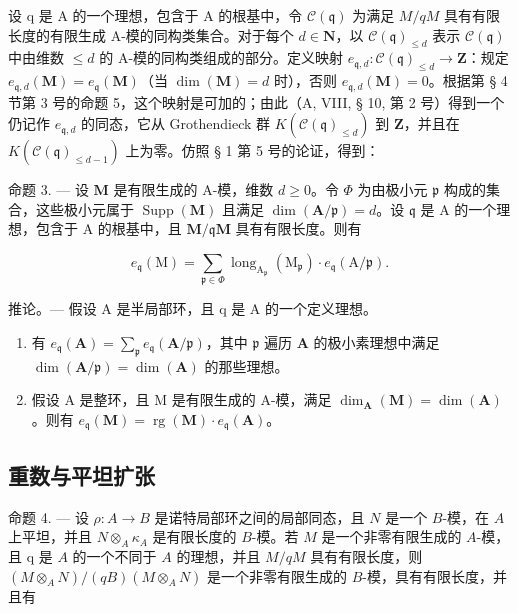 设 q 是 A 的一个理想，包含于 A 的根基中，令 \(\mathcal{C}(\mathfrak{q})\) 为满足 \(M/qM\) 具有有限长度的有限生成 A-模的同构类集合。对于每个 \(d \in \mathbf{N}\)，以 \(\mathcal{C}(\mathfrak{q})_{\leq d}\) 表示 \(\mathcal{C}(\mathfrak{q})\) 中由维数 \(\leqslant d\) 的 A-模的同构类组成的部分。定义映射 \(e_{\mathfrak{q},d}: \mathcal{C}(\mathfrak{q})_{\leq d} \to \mathbf{Z}\)：规定 \(e_{\mathfrak{q},d}(\mathbf{M}) = e_{\mathfrak{q}}(\mathbf{M})\)（当 \(\dim(\mathbf{M}) = d\) 时），否则 \(e_{\mathfrak{q},d}(\mathbf{M}) = 0\)。根据第 § 4 节第 3 号的命题 5，这个映射是可加的；由此（A, VIII, § 10, 第 2 号）得到一个仍记作 \(e_{\mathfrak{q},d}\) 的同态，它从 Grothendieck 群 \(K(\mathcal{C}(\mathfrak{q})_{\leq d})\) 到 \(\mathbf{Z}\)，并且在 \(K(\mathcal{C}(\mathfrak{q})_{\leq d-1})\) 上为零。仿照 § 1 第 5 号的论证，得到：

命题 3. — 设 \(\mathbf{M}\) 是有限生成的 A-模，维数 \(d \geqslant 0\)。令 \(\Phi\) 为由极小元 \(\mathfrak{p}\) 构成的集合，这些极小元属于 \(\operatorname{Supp}(\mathbf{M})\) 且满足 \(\dim(\mathbf{A}/\mathfrak{p}) = d\)。设 \(\mathfrak{q}\) 是 A 的一个理想，包含于 A 的根基中，且 \(\mathbf{M}/\mathfrak{q}\mathbf{M}\) 具有有限长度。则有

\[
e _ {\mathfrak {q}} (\mathrm{M}) = \sum_ {\mathfrak {p} \in \Phi} \operatorname{long} _ {\mathrm{A} _ {\mathfrak {p}}} (\mathrm{M} _ {\mathfrak {p}}) \cdot e _ {\mathfrak {q}} (\mathrm{A} / \mathfrak {p}).
\]

推论。— 假设 A 是半局部环，且 q 是 A 的一个定义理想。

\begin{enumerate}
\def\labelenumi{\alph{enumi})}
\item
  有 \(e_{\mathfrak{q}}(\mathbf{A}) = \sum_{\mathfrak{p}} e_{\mathfrak{q}}(\mathbf{A}/\mathfrak{p})\)，其中 \(\mathfrak{p}\) 遍历 \(\mathbf{A}\) 的极小素理想中满足 \(\dim(\mathbf{A}/\mathfrak{p}) = \dim(\mathbf{A})\) 的那些理想。
\item
  假设 A 是整环，且 M 是有限生成的 A-模，满足 \(\dim_{\mathbf{A}}(\mathbf{M}) = \dim(\mathbf{A})\)。则有 \(e_{\mathfrak{q}}(\mathbf{M}) = \operatorname{rg}(\mathbf{M}) \cdot e_{\mathfrak{q}}(\mathbf{A})\)。
\end{enumerate}

\subsection{重数与平坦扩张}

命题 4. — 设 \(\rho: A \to B\) 是诺特局部环之间的局部同态，且 \(N\) 是一个 \(B\)-模，在 \(A\) 上平坦，并且 \(N \otimes_A \kappa_A\) 是有限长度的 \(B\)-模。若 \(M\) 是一个非零有限生成的 \(A\)-模，且 q 是 \(A\) 的一个不同于 \(A\) 的理想，并且 \(M/qM\) 具有有限长度，则 \((M \otimes_A N)/(qB)(M \otimes_A N)\) 是一个非零有限生成的 \(B\)-模，具有有限长度，并且有

